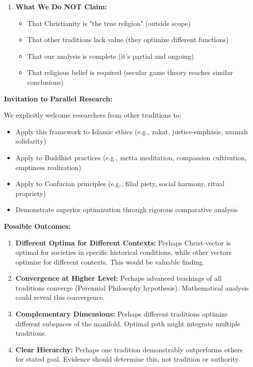 \documentclass[11pt,a4paper]{article}
\theoremstyle{definition}
\theoremstyle{remark}
\begin{document}
\begin{small}
\begin{enumerate}
\item \textbf{What We Do NOT Claim:}
\begin{itemize}
\item That Christianity is "the true religion" (outside scope)
\item That other traditions lack value (they optimize different functions)
\item That our analysis is complete (it's partial and ongoing)
\item That religious belief is required (secular game theory reaches similar conclusions)
\end{itemize}
\end{enumerate}

\textbf{Invitation to Parallel Research:}

We explicitly welcome researchers from other traditions to:
\begin{itemize}
\item Apply this framework to Islamic ethics (e.g., zakat, justice-emphasis, ummah solidarity)
\item Apply to Buddhist practices (e.g., metta meditation, compassion cultivation, emptiness realization)
\item Apply to Confucian principles (e.g., filial piety, social harmony, ritual propriety)
\item Demonstrate superior optimization through rigorous comparative analysis
\end{itemize}

\textbf{Possible Outcomes:}

\begin{enumerate}
\item \textbf{Different Optima for Different Contexts:}
Perhaps Christ-vector is optimal for societies in specific historical conditions, while other vectors optimize for different contexts. This would be valuable finding.

\item \textbf{Convergence at Higher Level:}
Perhaps advanced teachings of all traditions converge (Perennial Philosophy hypothesis). Mathematical analysis could reveal this convergence.

\item \textbf{Complementary Dimensions:}
Perhaps different traditions optimize different subspaces of the manifold. Optimal path might integrate multiple traditions.

\item \textbf{Clear Hierarchy:}
Perhaps one tradition demonstrably outperforms others for stated goal. Evidence should determine this, not tradition or authority.
\end{enumerate}


\end{small}
\end{document}
